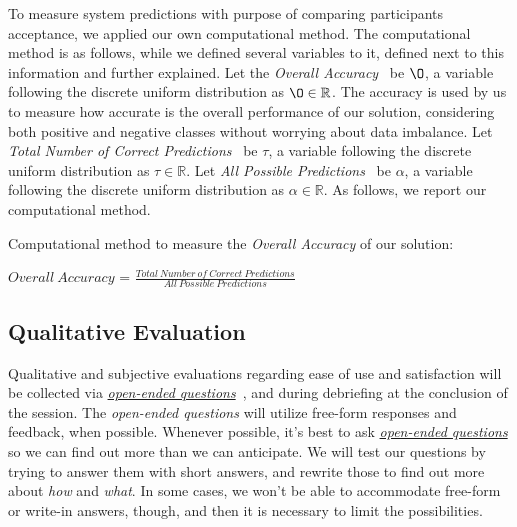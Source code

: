 To measure system predictions with purpose of comparing participants acceptance, we applied our own computational method. The computational method is as follows, while we defined several variables to it, defined next to this information and further explained. Let the {\it Overall Accuracy}~\cite{ashraf2018comparative, li2018digital} be $\O$, a variable following the discrete uniform distribution as $\O \in \mathbb{R}$. The accuracy is used by us to measure how accurate is the overall performance of our solution, considering both positive and negative classes without worrying about data imbalance. Let {\it Total Number of Correct Predictions}~\cite{ashraf2018comparative, li2018digital} be $\tau$, a variable following the discrete uniform distribution as $\tau \in \mathbb{R}$. Let {\it All Possible Predictions}~\cite{ashraf2018comparative, li2018digital} be $\alpha$, a variable following the discrete uniform distribution as $\alpha \in \mathbb{R}$. As follows, we report our computational method.

\hfill

Computational method to measure the {\it Overall Accuracy} of our solution:

\hfill

\begin{Form}
\Large
\begin{center}
$Overall~Accuracy$ = $\frac{Total~Number~of~Correct~Predictions}{All~Possible~Predictions}$
\end{center}
\end{Form}

\hfill

\subsection{Qualitative Evaluation}

Qualitative and subjective evaluations regarding ease of use and satisfaction will be collected via {\it \hyperlink{https://www.nngroup.com/articles/open-ended-questions/}{open-ended questions}}~\cite{abelson2016supporting, merchant2018digital}, and during debriefing at the conclusion of the session.  The {\it open-ended questions} will utilize free-form responses and feedback, when possible. Whenever possible, it's best to ask {\it \hyperlink{https://www.nngroup.com/articles/open-ended-questions/}{open-ended questions}} so we can find out more than we can anticipate. We will test our questions by trying to answer them with short answers, and rewrite those to find out more about {\it how} and {\it what}. In some cases, we won't be able to accommodate free-form or write-in answers, though, and then it is necessary to limit the possibilities.

